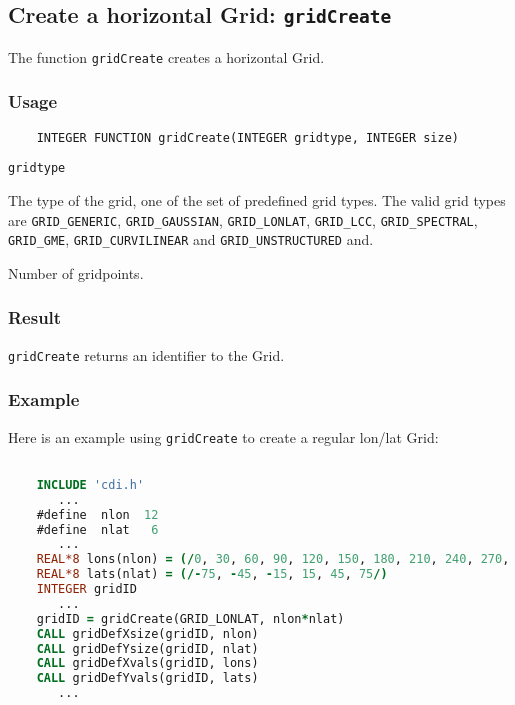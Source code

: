 

\subsection{Create a horizontal Grid: {\tt gridCreate}}
\label{gridCreate}

The function {\tt gridCreate} creates a horizontal Grid.

\subsubsection*{Usage}

\begin{verbatim}
    INTEGER FUNCTION gridCreate(INTEGER gridtype, INTEGER size)
\end{verbatim}

\hspace*{4mm}\begin{minipage}[]{15cm}
\begin{deflist}{\tt gridtype\ }
\item[{\tt gridtype}]
The type of the grid, one of the set of predefined {\CDI} grid types.
                     The valid {\CDI} grid types are {\tt GRID\_GENERIC}, {\tt GRID\_GAUSSIAN},
                     {\tt GRID\_LONLAT}, {\tt GRID\_LCC}, {\tt GRID\_SPECTRAL},
                     {\tt GRID\_GME}, {\tt GRID\_CURVILINEAR} and {\tt GRID\_UNSTRUCTURED} and.
\item[{\tt size}]
Number of gridpoints.

\end{deflist}
\end{minipage}

\subsubsection*{Result}

{\tt gridCreate} returns an identifier to the Grid.


\subsubsection*{Example}

Here is an example using {\tt gridCreate} to create a regular lon/lat Grid:

\begin{lstlisting}[language=Fortran, backgroundcolor=\color{pyellow}, basicstyle=\small, columns=flexible]

    INCLUDE 'cdi.h'
       ...
    #define  nlon  12
    #define  nlat   6
       ...
    REAL*8 lons(nlon) = (/0, 30, 60, 90, 120, 150, 180, 210, 240, 270, 300, 330/)
    REAL*8 lats(nlat) = (/-75, -45, -15, 15, 45, 75/)
    INTEGER gridID
       ...
    gridID = gridCreate(GRID_LONLAT, nlon*nlat)
    CALL gridDefXsize(gridID, nlon)
    CALL gridDefYsize(gridID, nlat)
    CALL gridDefXvals(gridID, lons)
    CALL gridDefYvals(gridID, lats)
       ...
\end{lstlisting}


